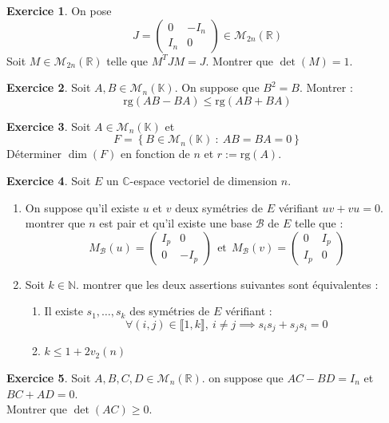 \documentclass[french]{book}
\newcommand{\N}{\mathbb{N}}
\newcommand{\R}{\mathbb{R}}
\newcommand{\C}{\mathbb{C}}
\newcommand{\K}{\mathbb{K}}
\theoremstyle{definition}
\newtheorem{ex}{Exercice}[chapter]
\begin{document}
\begin{ex}
	On pose $$J=\begin{pmatrix}
		0&-I_n\\
		I_n&0
	\end{pmatrix}\in\mathcal{M}_{2n}(\R)$$ Soit $M\in\mathcal{M}_{2n}(\R)$ telle que $M^TJM=J$. Montrer que $\det(M)=1$.
\end{ex}

\begin{ex}
	Soit $A,B\in\mathcal{M}_n(\K)$. On suppose que $B^2=B$. Montrer : $$\text{rg}(AB-BA)\leqslant\text{rg}(AB+BA)$$
\end{ex}

\begin{ex}
	Soit $A\in\mathcal{M}_n(\K)$ et $$F=\left\{B\in\mathcal{M}_n(\K)\ : \ AB=BA=0\right\}$$ Déterminer $\dim(F)$ en fonction de $n$ et $r:=\text{rg}(A)$.
\end{ex}

\begin{ex}
	Soit $E$ un $\C$-espace vectoriel de dimension $n$.
	\begin{enumerate}
		\item On suppose qu'il existe $u$ et $v$ deux symétries de $E$ vérifiant $uv+vu=0$. montrer que $n$ est pair et qu'il existe une base $\mathcal{B}$ de $E$ telle que : $$M_\mathcal{B}(u)=\begin{pmatrix}
			I_p&0\\
			0&-I_p
		\end{pmatrix}\ \ \text{et}\ \ M_\mathcal{B}(v)=\begin{pmatrix}
		0&I_p\\
		I_p&0
		\end{pmatrix}$$
		\item Soit $k\in\N$. montrer que les deux assertions suivantes sont équivalentes :
		\begin{enumerate}[label=\roman*]
			\item Il existe $s_1,\ldots,s_k$ des symétries de $E$ vérifiant : $$\forall (i,j)\in\llbracket1,k\rrbracket,\ i\ne j\implies s_is_j+s_js_i=0$$
			\item $k\leqslant 1+2v_2(n)$
		\end{enumerate}
	\end{enumerate}
\end{ex}

\begin{ex}
	Soit $A,B,C,D\in\mathcal{M}_n(\R)$. on suppose que $AC-BD=I_n$ et $BC+AD=0$.\\ Montrer que $\det(AC)\geqslant0$.
\end{ex}
\end{document}
